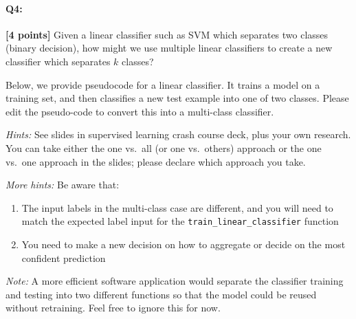 \pagebreak
\paragraph{Q4:} \textbf{[4 points]} Given a linear classifier such as SVM which separates two classes (binary decision), how might we use multiple linear classifiers to create a new classifier which separates $k$ classes?

\begin{tcolorbox}[colback=orange!5!white,colframe=orange!75!black]
    Below, we provide pseudocode for a linear classifier. It trains a model on a training set, and then classifies a new test example into one of two classes. Please edit the pseudo-code to convert this into a multi-class classifier. 
\end{tcolorbox}
    
\emph{Hints:} See slides in supervised learning crash course deck, plus your own research. You can take either the one vs.~all (or one vs.~others) approach or the one vs.~one approach in the slides; please declare which approach you take.

\emph{More hints:} Be aware that:
\begin{enumerate}
    \item The input labels in the multi-class case are different, and you will need to match the expected label input for the \texttt{train\_linear\_classifier} function
    \item You need to make a new decision on how to aggregate or decide on the most confident prediction
\end{enumerate}

\emph{Note:} A more efficient software application would separate the classifier training and testing into two different functions so that the model could be reused without retraining. Feel free to ignore this for now.


